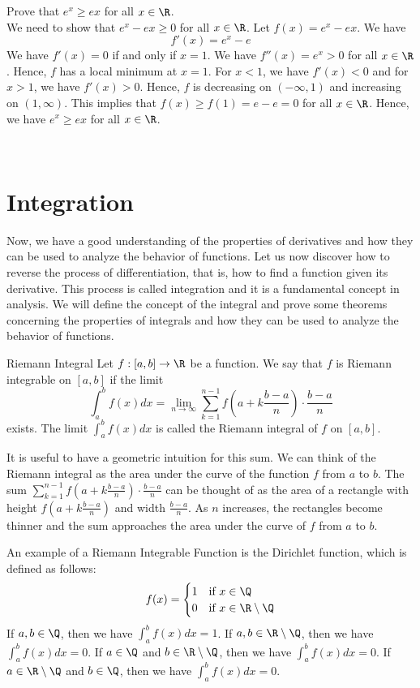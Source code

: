 \documentclass[openany]{book}
\begin{document}
Prove that $e^x \geq ex$ for all $x \in \R$. \\
We need to show that $e^x - ex \geq 0$ for all $x \in \R$. Let $f(x) = e^x - ex$. We have
\[ f'(x) = e^x - e \]
We have $f'(x) = 0$ if and only if $x = 1$. We have $f''(x) = e^x > 0$ for all $x \in \R$. Hence, $f$ has a local minimum at $x = 1$. For $x < 1$, we have $f'(x) < 0$ and for $x > 1$, we have $f'(x) > 0$. Hence, $f$ is decreasing on $(-\infty, 1)$ and increasing on $(1, \infty)$. This implies that $f(x) \geq f(1) = e - e = 0$ for all $x \in \R$. Hence, we have $e^x \geq ex$ for all $x \in \R$.


\\


\chapter{Integration}
Now, we have a good understanding of the properties of derivatives and how they can be used to analyze the behavior of functions. Let us now discover how to reverse the process of differentiation, that is, how to find a function given its derivative. This process is called integration and it is a fundamental concept in analysis. We will define the concept of the integral and prove some theorems concerning the properties of integrals and how they can be used to analyze the behavior of functions.
\begin{mydefinition}{Riemann Integral}
    Let $f: [a, b] \to \R$ be a function. We say that $f$ is Riemann integrable on $[a, b]$ if the limit
    \[
        \int_a^b f(x) dx = \lim_{n \to \infty} \sum_{k=1}^{n-1} f(a + k\frac{b-a}{n}) \cdot \frac{b-a}{n}
    \]
    exists. The limit $\int_a^b f(x) dx$ is called the Riemann integral of $f$ on $[a, b]$.
\end{mydefinition}
It is useful to have a geometric intuition for this sum. We can think of the Riemann integral as the area under the curve of the function $f$ from $a$ to $b$. The sum $\sum_{k=1}^{n-1} f(a + k\frac{b-a}{n}) \cdot \frac{b-a}{n}$ can be thought of as the area of a rectangle with height $f(a + k\frac{b-a}{n})$ and width $\frac{b-a}{n}$. As $n$ increases, the rectangles become thinner and the sum approaches the area under the curve of $f$ from $a$ to $b$. 
\begin{example}
    An example of a Riemann Integrable Function is the Dirichlet function, which is defined as follows:
\[
    f(x) = \begin{cases}
        1 & \text{if } x \in \Q \\
        0 & \text{if } x \in \R \setminus \Q
    \end{cases}
\]
If $a, b \in \Q$, then we have $\int_a^b f(x) dx = 1$. If $a, b \in \R \setminus \Q$, then we have $\int_a^b f(x) dx = 0$. If $a \in \Q$ and $b \in \R \setminus \Q$, then we have $\int_a^b f(x) dx = 0$. If $a \in \R \setminus \Q$ and $b \in \Q$, then we have $\int_a^b f(x) dx = 0$.
\end{example}
\end{document}
